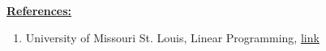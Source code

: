 \documentclass[12pt]{article}
\begin{document}
\begin{enumerate}[1.]
\begin{itemize}
        \underline{\textbf{References:}}

        \bigskip

        \begin{enumerate}[1)]
            \item University of Missouri St. Louis, Linear Programming, \href{http://umsl.edu/~adhikarib/cs4130-fall2017/slides/10%20-%20Linear%20Programming.pdf}{link}
        \end{enumerate}
    \end{itemize}


\end{enumerate}
\end{document}
